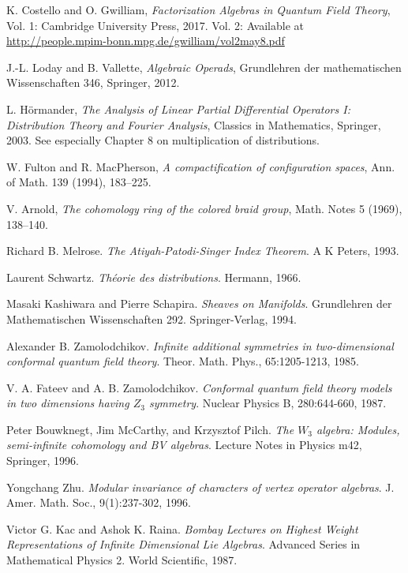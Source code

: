 \begin{thebibliography}{99}
 K. Costello and O. Gwilliam,
\emph{Factorization Algebras in Quantum Field Theory},
Vol. 1: Cambridge University Press, 2017.
Vol. 2: Available at \url{http://people.mpim-bonn.mpg.de/gwilliam/vol2may8.pdf}

 J.-L. Loday and B. Vallette,
\emph{Algebraic Operads},
Grundlehren der mathematischen Wissenschaften 346, Springer, 2012.

 L. Hörmander,
\emph{The Analysis of Linear Partial Differential Operators I: Distribution Theory and Fourier Analysis},
Classics in Mathematics, Springer, 2003.
See especially Chapter 8 on multiplication of distributions.

 W. Fulton and R. MacPherson,
\emph{A compactification of configuration spaces},
Ann. of Math. 139 (1994), 183--225.

 V. Arnold,
\emph{The cohomology ring of the colored braid group},
Math. Notes 5 (1969), 138--140.

Richard B. Melrose.
\textit{The Atiyah-Patodi-Singer Index Theorem}.
A K Peters, 1993.

Laurent Schwartz.
\textit{Théorie des distributions}.
Hermann, 1966.

Masaki Kashiwara and Pierre Schapira.
\textit{Sheaves on Manifolds}.
Grundlehren der Mathematischen Wissenschaften 292.
Springer-Verlag, 1994.

Alexander B. Zamolodchikov.
\textit{Infinite additional symmetries in two-dimensional conformal quantum field theory}.
Theor. Math. Phys., 65:1205-1213, 1985.

V. A. Fateev and A. B. Zamolodchikov.
\textit{Conformal quantum field theory models in two dimensions having $Z_3$ symmetry}.
Nuclear Physics B, 280:644-660, 1987.

Peter Bouwknegt, Jim McCarthy, and Krzysztof Pilch.
\textit{The $W_3$ algebra: Modules, semi-infinite cohomology and BV algebras}.
Lecture Notes in Physics m42, Springer, 1996.

Yongchang Zhu.
\textit{Modular invariance of characters of vertex operator algebras}.
J. Amer. Math. Soc., 9(1):237-302, 1996.

Victor G. Kac and Ashok K. Raina.
\textit{Bombay Lectures on Highest Weight Representations of Infinite Dimensional Lie Algebras}.
Advanced Series in Mathematical Physics 2.
World Scientific, 1987.
 
\end{thebibliography}